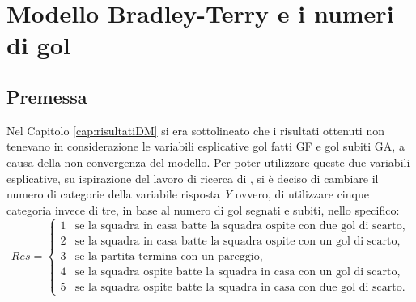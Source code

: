 
\chapter{Modello Bradley-Terry e i numeri di gol }
\label{cap:extraDM}
\section{Premessa}
Nel Capitolo \ref{cap:risultatiDM} si era sottolineato che i risultati ottenuti non tenevano in considerazione le variabili esplicative gol fatti \textsf{GF} e gol subiti \textsf{GA}, a causa della non convergenza del modello. Per poter utilizzare queste due variabili esplicative, su ispirazione del lavoro di ricerca di \textcite{schauberger2017}, si è deciso di cambiare il numero di categorie della variabile risposta \emph{Y} ovvero, di utilizzare cinque categoria invece di tre, in base al numero di gol segnati e subiti, nello specifico:
\begin{equation}
	Res =
	\begin{cases}
		1 & \text{se la squadra in casa batte la squadra ospite con due gol di scarto,}\\
		2 & \text{se la squadra in casa batte la squadra ospite con un gol di scarto,}\\
		3 & \text{se la partita termina con un pareggio,}\\
		4 & \text{se la squadra ospite batte la squadra in casa con un gol di scarto, }\\
		5 & \text{se la squadra ospite batte la squadra in casa con due gol di scarto.}
	\end{cases}       
\end{equation}

